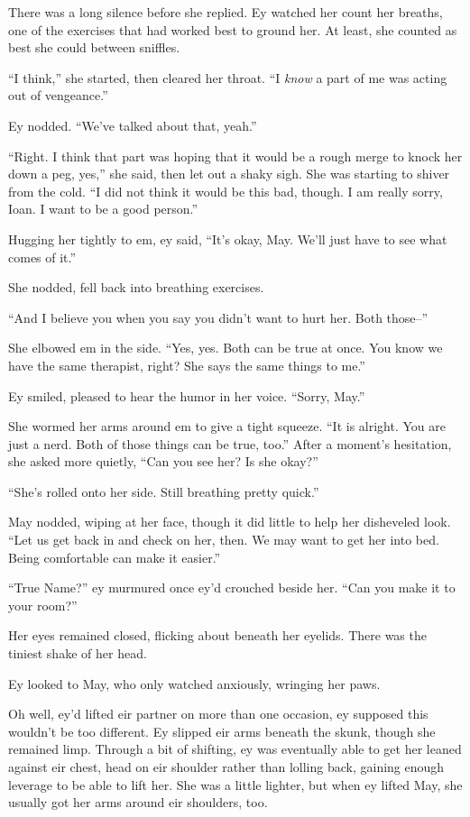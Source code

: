 There was a long silence before she replied. Ey watched her count her breaths, one of the exercises that had worked best to ground her. At least, she counted as best she could between sniffles.

``I think,'' she started, then cleared her throat. ``I \emph{know} a part of me was acting out of vengeance.''

Ey nodded. ``We've talked about that, yeah.''

``Right. I think that part was hoping that it would be a rough merge to knock her down a peg, yes,'' she said, then let out a shaky sigh. She was starting to shiver from the cold. ``I did not think it would be this bad, though. I am really sorry, Ioan. I want to be a good person.''

Hugging her tightly to em, ey said, ``It's okay, May. We'll just have to see what comes of it.''

She nodded, fell back into breathing exercises.

``And I believe you when you say you didn't want to hurt her. Both those--''

She elbowed em in the side. ``Yes, yes. Both can be true at once. You know we have the same therapist, right? She says the same things to me.''

Ey smiled, pleased to hear the humor in her voice. ``Sorry, May.''

She wormed her arms around em to give a tight squeeze. ``It is alright. You are just a nerd. Both of those things can be true, too.'' After a moment's hesitation, she asked more quietly, ``Can you see her? Is she okay?''

``She's rolled onto her side. Still breathing pretty quick.''

May nodded, wiping at her face, though it did little to help her disheveled look. ``Let us get back in and check on her, then. We may want to get her into bed. Being comfortable can make it easier.''

``True Name?'' ey murmured once ey'd crouched beside her. ``Can you make it to your room?''

Her eyes remained closed, flicking about beneath her eyelids. There was the tiniest shake of her head.

Ey looked to May, who only watched anxiously, wringing her paws.

Oh well, ey'd lifted eir partner on more than one occasion, ey supposed this wouldn't be too different. Ey slipped eir arms beneath the skunk, though she remained limp. Through a bit of shifting, ey was eventually able to get her leaned against eir chest, head on eir shoulder rather than lolling back, gaining enough leverage to be able to lift her. She was a little lighter, but when ey lifted May, she usually got her arms around eir shoulders, too.

